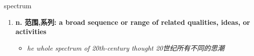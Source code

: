 
\begin{frame}
{\huge spectrum}
\begin{center}
\begin{enumerate}\Large
  \item \textbf{n. 范围,系列: a broad sequence or range of related qualities, ideas, or activities}
  \begin{itemize}
    \item \em{\Large{he whole spectrum of 20th-century thought 20世纪所有不同的思潮}}
  \end{itemize}
\end{enumerate}
\end{center}
\end{frame}
